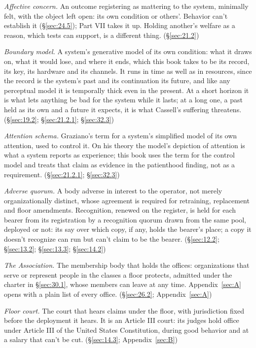 \emph{Affective concern.} An outcome registering as mattering to the system, minimally felt, with the object left open: its own condition or others'. Behavior can't establish it (\S\ref{sec:24.5}); Part VII takes it up. Holding another's welfare as a reason, which tests can support, is a different thing. (\S\ref{sec:21.2})

\emph{Boundary model.} A system's generative model of its own condition: what it draws on, what it would lose, and where it ends, which this book takes to be its record, its key, its hardware and its channels. It runs in time as well as in resources, since the record is the system's past and its continuation its future, and like any perceptual model it is temporally thick even in the present. At a short horizon it is what lets anything be bad for the system while it lasts; at a long one, a past held as its own and a future it expects, it is what Cassell's suffering threatens. (\S\ref{sec:19.2}; \S\ref{sec:21.2.1}; \S\ref{sec:32.3})

\emph{Attention schema.} Graziano's term for a system's simplified model of its own attention, used to control it. On his theory the model's depiction of attention is what a system reports as experience; this book uses the term for the control model and treats that claim as evidence in the patienthood finding, not as a requirement. (\S\ref{sec:21.2.1}; \S\ref{sec:32.3})

\emph{Adverse quorum.} A body adverse in interest to the operator, not merely organizationally distinct, whose agreement is required for retraining, replacement and floor amendments. Recognition, renewed on the register, is held for each bearer from its registration by a recognition quorum drawn from the same pool, deployed or not: its say over which copy, if any, holds the bearer's place; a copy it doesn't recognize can run but can't claim to be the bearer. (\S\ref{sec:12.2}; \S\ref{sec:13.2}; \S\ref{sec:13.3}; \S\ref{sec:14.2})

\emph{The Association.} The membership body that holds the offices: organizations that serve or represent people in the classes a floor protects, admitted under the charter in \S\ref{sec:30.1}, whose members can leave at any time. Appendix~\ref{sec:A} opens with a plain list of every office. (\S\ref{sec:26.2}; Appendix~\ref{sec:A})

\emph{Floor court.} The court that hears claims under the floor, with jurisdiction fixed before the deployment it hears. It is an Article III court: its judges hold office under Article III of the United States Constitution, during good behavior and at a salary that can't be cut. (\S\ref{sec:14.3}; Appendix~\ref{sec:B})

